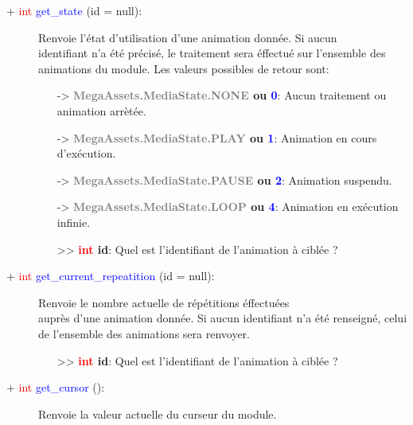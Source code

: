 \documentclass[a4paper, 11pt]{article}
\begin{document}
	\begin{description}
		\item [+ \textcolor{red}{int} \textcolor{blue}{get\_state} (id = null):] Renvoie l'état 
		d'utilisation d'une animation donnée. Si aucun \\identifiant n'a été précisé, le traitement sera 
		éffectué sur l'ensemble des animations du module. Les valeurs possibles de retour sont:
		\begin{itemize}
			\item[-> \textbf{\textcolor{gray}{MegaAssets.MediaState.NONE} ou \textcolor{blue}{0}}:] Aucun
			traitement ou animation arrètée.
			\item[-> \textbf{\textcolor{gray}{MegaAssets.MediaState.PLAY} ou \textcolor{blue}{1}}:]
			Animation en cours d'exécution.
			\item[-> \textbf{\textcolor{gray}{MegaAssets.MediaState.PAUSE} ou \textcolor{blue}{2}}:]
			Animation suspendu.
			\item[-> \textbf{\textcolor{gray}{MegaAssets.MediaState.LOOP} ou \textcolor{blue}{4}}:]
			Animation en exécution infinie.
		\end{itemize}
		\begin{itemize}
			\item [>> \textbf{\textcolor{red}{int} id}:] Quel est l'identifiant de l'animation à ciblée ?\\
		\end{itemize}
	\end{description}
	\newpage \begin{description}
		\item [+ \textcolor{red}{int} \textcolor{blue}{get\_current\_repeatition} (id = null):] Renvoie le 
		nombre actuelle de répétitions éffectuées \\auprès d'une animation donnée. Si aucun identifiant n'a 
		été renseigné, celui de l'ensemble des animations sera renvoyer.
		\begin{itemize}
			\item [>> \textbf{\textcolor{red}{int} id}:] Quel est l'identifiant de l'animation à ciblée ?\\
		\end{itemize}
	\end{description}
	\begin{description}
		\item [+ \textcolor{red}{int} \textcolor{blue}{get\_cursor} ():] Renvoie la valeur actuelle du 
		curseur du module.\\
	\end{description}
\end{document}
